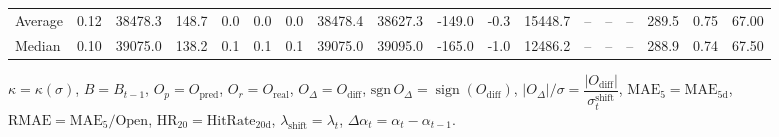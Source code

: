 \begin{threeparttable}
{\begin{tabular}{lrrrrrrrrrrrrrrrrr}
Average &     0.12 & 38478.3 &             148.7 &               0.0 &                0.0 &                0.0 & 38478.4 & 38627.3 &     -149.0 &                     -0.3 &             15448.7 &         -- &        -- &             -- &            289.5 &            0.75 &                  67.00 \\
 Median &     0.10 & 39075.0 &             138.2 &               0.1 &                0.1 &                0.1 & 39075.0 & 39095.0 &     -165.0 &                     -1.0 &             12486.2 &         -- &        -- &             -- &            288.9 &            0.74 &                  67.50 \\
\bottomrule
\end{tabular}
}
\begin{tablenotes}\footnotesize
\item $\kappa=\kappa(\sigma)$, $B=B_{t-1}$, $O_p=O_{\text{pred}}$, $O_r=O_{\text{real}}$, $O_\Delta=O_{\text{diff}}$, $\mathrm{sgn}\,O_\Delta=\operatorname{sign}(O_{\text{diff}})$, $|O_\Delta|/\sigma=\dfrac{|O_{\text{diff}}|}{\sigma_t^{\text{shift}}}$, $\mathrm{MAE}_5=\mathrm{MAE}_{5\text{d}}$, $\mathrm{RMAE}= \mathrm{MAE}_5 / \text{Open}$, $\mathrm{HR}_{20}=\mathrm{HitRate}_{20\text{d}}$, 
$\lambda_{\text{shift}}=\lambda_t$, 
$\Delta\alpha_t=\alpha_t-\alpha_{t-1}$.
\end{tablenotes}
\end{threeparttable}
\endgroup

